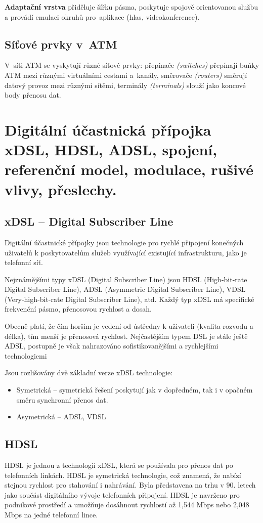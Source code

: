 \textbf{Adaptační vrstva} přiděluje šířku pásma, poskytuje spojově orientovanou službu a provádí emulaci okruhů pro~aplikace (hlas, videokonference).


\subsection{Síťové prvky v~ATM}

V~síti ATM se vyskytují různé síťové prvky:
přepínače \emph{(switches)} přepínají buňky ATM mezi různými virtuálními cestami a~kanály,
směrovače \emph{(routers)} směrují datový provoz mezi různými sítěmi,
terminály \emph{(terminals)} slouží jako koncové body přenosu dat.


\clearpage
\section{Digitální účastnická přípojka xDSL, HDSL, ADSL, spojení, referenční model, modulace, rušivé vlivy, přeslechy.}

\subsection{xDSL -- Digital Subscriber Line}
Digitální účastnické přípojky jsou technologie pro rychlé připojení konečných uživatelů k poskytovatelům služeb využívající existující infrastrukturu, jako je telefonní síť.

Nejznámějšími typy xDSL (Digital Subscriber Line) jsou HDSL (High-bit-rate Digital Subscriber Line), ADSL (Asymmetric Digital Subscriber Line), VDSL (Very-high-bit-rate Digital Subscriber Line), atd. Každý typ xDSL má specifické frekvenční pásmo, přenosovou rychlost a dosah.

Obecně platí, že čím horším je vedení od ústředny k uživateli (kvalita rozvodu a délka), tím menší je přenosová rychlost. Nejčastějším typem DSL je stále ještě ADSL, postupně je však nahrazováno sofistikovanějšími a rychlejšími technologiemi

Jsou rozlišovány dvě základní verze xDSL technologie:
\begin{itemize}
    \item Symetrická -- symetrická řešení poskytují jak v dopředném, tak i v opačném směru synchronní přenos dat.
    \item Asymetrická -- ADSL, VDSL
\end{itemize}

\subsection{HDSL}
HDSL je jednou z technologií xDSL, která se používala pro přenos dat po telefonních linkách. HDSL je symetrická technologie, což znamená, že nabízí stejnou rychlost pro stahování i nahrávání. Byla představena na trhu v 90. letech jako součást digitálního vývoje telefonních připojení. HDSL je navrženo pro podnikové prostředí a umožňuje dosáhnout rychlostí až 1,544 Mbps nebo 2,048 Mbps na jedné telefonní lince.

